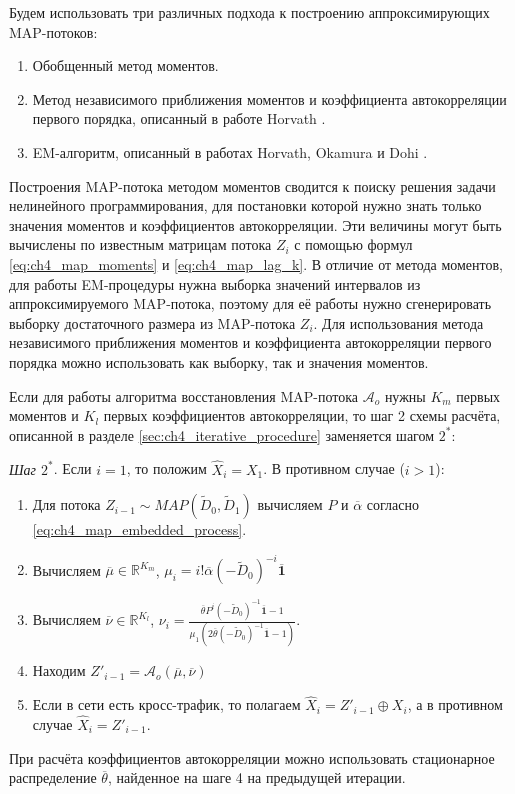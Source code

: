 Будем использовать три различных подхода к построению аппроксимирующих MAP-потоков:

\begin{enumerate}
\item Обобщенный метод моментов.
\item Метод независимого приближения моментов и коэффициента автокорреляции первого порядка, описанный в работе Horvath \cite{Horvath2005}.
\item EM-алгоритм, описанный в работах Horvath, Okamura и Dohi \cite{Okamura2009,Horvath2013}.
\end{enumerate}

Построения MAP-потока методом моментов сводится к поиску решения задачи нелинейного программирования, для постановки которой нужно знать только значения моментов и коэффициентов автокорреляции. Эти величины могут быть вычислены по известным матрицам потока $Z_i$ с помощью формул \eqref{eq:ch4_map_moments} и \eqref{eq:ch4_map_lag_k}. В отличие от метода моментов, для работы EM-процедуры нужна выборка значений интервалов из аппроксимируемого MAP-потока, поэтому для её работы нужно сгенерировать выборку достаточного размера из MAP-потока $Z_i$. Для использования метода независимого приближения моментов и коэффициента автокорреляции первого порядка можно использовать как выборку, так и значения моментов.

Если для работы алгоритма восстановления MAP-потока $\mathcal{A}_o$ нужны $K_m$ первых моментов и $K_l$ первых коэффициентов автокорреляции, то шаг 2 схемы расчёта, описанной в разделе \ref{sec:ch4_iterative_procedure} заменяется шагом $2^*$:

\textit{Шаг $2^*$}. Если $i = 1$, то положим $\hat{X}_i = X_1$. В противном случае ($i > 1$):
\begin{enumerate}
\item Для потока $Z_{i-1} \sim MAP(\tilde{D}_0, \tilde{D}_1)$ вычисляем $P$ и $\overline\alpha$ согласно \eqref{eq:ch4_map_embedded_process}.
\item Вычисляем $\overline\mu \in \mathbb{R}^{K_m}$, $\mu_i = i! \overline\alpha (-\tilde{D}_0)^{-i} \overline{\mathbf{1}}$
\item Вычисляем $\overline\nu \in \mathbb{R}^{K_l}$, $\nu_i = \frac{\overline\theta P^i (-\tilde{D}_0)^{-1} \overline{\mathbf{1}} - 1}{\mu_1 \left( 2 \overline\theta (-\tilde{D}_0)^{-1} \overline{\mathbf{1}} - 1 \right)}$.
\item Находим $Z'_{i-1} = \mathcal{A}_o(\overline\mu, \overline\nu)$
\item Если в сети есть кросс-трафик, то полагаем $\hat{X}_i = Z'_{i-1} \oplus X_i$, а в противном случае $\hat{X}_i = Z'_{i-1}$.
\end{enumerate}
При расчёта коэффициентов автокорреляции можно использовать стационарное распределение $\overline\theta$, найденное на шаге 4 на предыдущей итерации.

